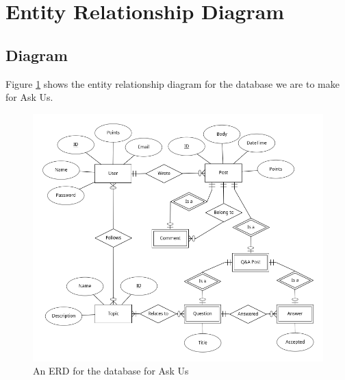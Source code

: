 \section{Entity Relationship Diagram}

\subsection{Diagram}

Figure \ref{erd} shows the entity relationship diagram for the database we are to make for Ask Us.

\begin{figure}[htb]
	\centering
	\includegraphics[width=\linewidth]{../ERD/erd.png}
	\caption{An ERD for the database for Ask Us}
	\label{erd}
\end{figure}